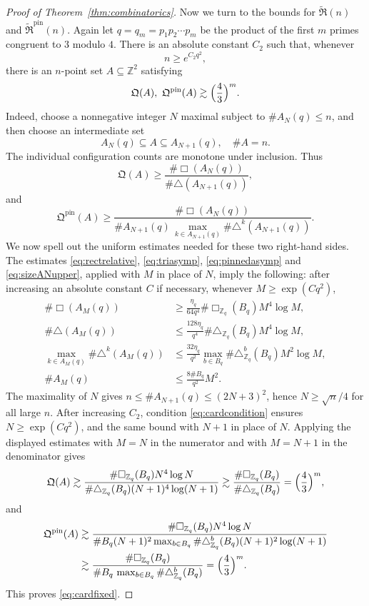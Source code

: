 \documentclass[10pt,a4paper]{amsart}
\numberwithin{equation}{section}
\renewcommand{\le}{\leqslant}
\renewcommand{\ge}{\geqslant}
\begin{document}
\begin{proof}[Proof of Theorem~\ref{thm:combinatorics}]
Now we turn to the bounds for $\widetilde{\mathfrak{R}}(n)$ and $\widetilde{\mathfrak{R}}^{\mathrm{pin}}(n)$.
Again let $q=q_m=p_1p_2\cdots p_m$ be the product of the first $m$ primes congruent to $3$ modulo $4$. There is an absolute constant $C_2$ such that, whenever
\begin{equation}\label{eq:cardcondition}
n\ge e^{C_2q^2},
\end{equation}
there is an $n$-point set $A\subseteq\mathbb{Z}^2$ satisfying
\begin{equation}\label{eq:cardfixed}
\mathfrak{Q}(A),\ \mathfrak{Q}^{\mathrm{pin}}(A) \gtrsim \Bigl(\frac{4}{3}\Bigr)^m.
\end{equation}
Indeed, choose a nonnegative integer $N$ maximal subject to
$\#A_N(q)\le n$, and then choose an intermediate set
\[ A_N(q)\subseteq A\subseteq A_{N+1}(q), \quad \#A=n. \]
The individual configuration counts are monotone under inclusion. Thus
\[ \mathfrak{Q}(A) \ge \frac{\#\Box(A_N(q))}{\#\triangle(A_{N+1}(q))}, \]
and
\[ \mathfrak{Q}^{\mathrm{pin}}(A) \ge \frac{\#\Box(A_N(q))}{\#A_{N+1}(q)\,\max_{k\in A_{N+1}(q)}\limits \#\triangle^k(A_{N+1}(q))}. \]
We now spell out the uniform estimates needed for these two right-hand sides. The estimates \eqref{eq:rectrelative}, \eqref{eq:triasymp}, \eqref{eq:pinnedasymp} and \eqref{eq:sizeANupper}, applied with $M$ in place of $N$, imply the following: after increasing an absolute constant $C$ if necessary, whenever $M\ge \exp(C q^2)$,
\begin{align*}
\#\Box(A_M(q))
&\ge \frac{\eta_q}{64q^4}\#\Box_{\mathbb{Z}_q}(B_q)M^4\log M,\\
\#\triangle(A_M(q))
&\le \frac{128\eta_q}{q^4}\#\triangle_{\mathbb{Z}_q}(B_q)M^4\log M,\\
\max_{k\in A_M(q)}\#\triangle^k(A_M(q))
&\le \frac{32\eta_q}{q^2}\max_{b\in B_q}\#\triangle^b_{\mathbb{Z}_q}(B_q)M^2\log M,\\
\#A_M(q)
&\le \frac{8\#B_q}{q^2}M^2.
\end{align*}
The maximality of $N$ gives $n\le \#A_{N+1}(q)\le (2N+3)^2$, hence $N\ge \sqrt n/4$ for all large $n$. After increasing $C_2$, condition \eqref{eq:cardcondition} ensures $N\ge\exp(Cq^2)$, and the same bound with $N+1$ in place of $N$. Applying the displayed estimates with $M=N$ in the numerator and with $M=N+1$ in the denominator gives
\[ \mathfrak{Q}(A) \gtrsim \frac{\#\Box_{\mathbb{Z}_q}(B_q)N^4\log N}{\#\triangle_{\mathbb{Z}_q}(B_q)(N+1)^4\log(N+1)}
\gtrsim \frac{\#\Box_{\mathbb{Z}_q}(B_q)}{\#\triangle_{\mathbb{Z}_q}(B_q)}
=\Bigl(\frac43\Bigr)^m, \]
and
\begin{align*}
\mathfrak{Q}^{\mathrm{pin}}(A)
& \gtrsim \frac{\#\Box_{\mathbb{Z}_q}(B_q)N^4\log N}
{\#B_q (N+1)^2 \max_{b\in B_q}\#\triangle^b_{\mathbb{Z}_q}(B_q)(N+1)^2\log(N+1)} \\
&\gtrsim \frac{\#\Box_{\mathbb{Z}_q}(B_q)}{\#B_q\,\max_{b\in B_q}\#\triangle^b_{\mathbb{Z}_q}(B_q)}
=\Bigl(\frac43\Bigr)^m.
\end{align*}
This proves \eqref{eq:cardfixed}.


\end{proof}
\end{document}
